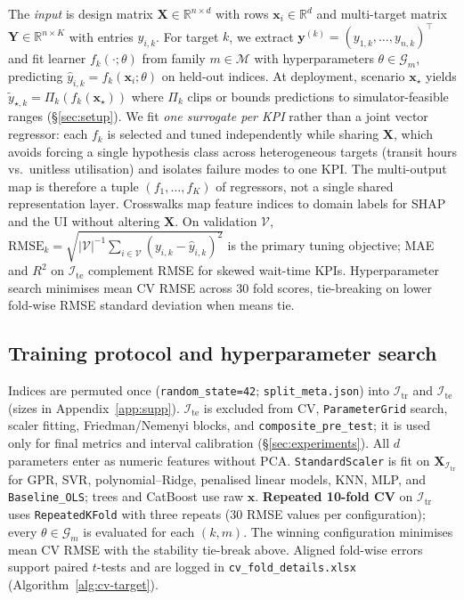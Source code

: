 \documentclass[10pt,twocolumn]{article}
\newcommand{\R}{\mathbb{R}}
\newcommand{\train}{\mathcal{I}_{\mathrm{tr}}}
\newcommand{\test}{\mathcal{I}_{\mathrm{te}}}
\begin{document}
The \emph{input} is design matrix $\mathbf{X} \in \R^{n \times d}$ with rows $\mathbf{x}_i \in \R^d$ and multi-target matrix $\mathbf{Y} \in \R^{n \times K}$ with entries $y_{i,k}$.
For target $k$, we extract $\mathbf{y}^{(k)} = (y_{1,k},\ldots,y_{n,k})^\top$ and fit learner $f_k(\cdot;\theta)$ from family $m \in \mathcal{M}$ with hyperparameters $\theta \in \mathcal{G}_m$, predicting $\hat{y}_{i,k} = f_k(\mathbf{x}_i;\theta)$ on held-out indices.
At deployment, scenario $\mathbf{x}_\star$ yields $\tilde{y}_{\star,k} = \Pi_k(f_k(\mathbf{x}_\star))$ where $\Pi_k$ clips or bounds predictions to simulator-feasible ranges (\S\ref{sec:setup}).
We fit \emph{one surrogate per KPI} rather than a joint vector regressor: each $f_k$ is selected and tuned independently while sharing $\mathbf{X}$, which avoids forcing a single hypothesis class across heterogeneous targets (transit hours vs.\ unitless utilisation) and isolates failure modes to one KPI.
The multi-output map is therefore a tuple $(f_1,\ldots,f_K)$ of regressors, not a single shared representation layer.
Crosswalks map feature indices to domain labels for SHAP and the UI without altering $\mathbf{X}$.
On validation $\mathcal{V}$, $\mathrm{RMSE}_k = \sqrt{|\mathcal{V}|^{-1}\sum_{i \in \mathcal{V}} (y_{i,k} - \hat{y}_{i,k})^2}$ is the primary tuning objective; MAE and $R^2$ on $\test$ complement RMSE for skewed wait-time KPIs.
Hyperparameter search minimises mean CV RMSE across $30$ fold scores, tie-breaking on lower fold-wise RMSE standard deviation when means tie.

\subsection{Training protocol and hyperparameter search}
\label{sec:method-protocol}

Indices are permuted once (\texttt{random\_state=42}; \texttt{split\_meta.json}) into $\train$ and $\test$ (sizes in Appendix~\ref{app:supp}).
$\test$ is excluded from CV, \texttt{ParameterGrid} search, scaler fitting, Friedman/Nemenyi blocks, and \texttt{composite\_pre\_test}; it is used only for final metrics and interval calibration (\S\ref{sec:experiments}).
All $d$ parameters enter as numeric features without PCA.
\texttt{StandardScaler} is fit on $\mathbf{X}_{\train}$ for GPR, SVR, polynomial--Ridge, penalised linear models, KNN, MLP, and \texttt{Baseline\_OLS}; trees and CatBoost use raw $\mathbf{x}$.
\textbf{Repeated 10-fold CV} on $\train$ uses \texttt{RepeatedKFold} with three repeats ($30$ RMSE values per configuration); every $\theta \in \mathcal{G}_m$ is evaluated for each $(k,m)$.
The winning configuration minimises mean CV RMSE with the stability tie-break above.
Aligned fold-wise errors support paired $t$-tests and are logged in \texttt{cv\_fold\_details.xlsx} (Algorithm~\ref{alg:cv-target}).
\end{document}
